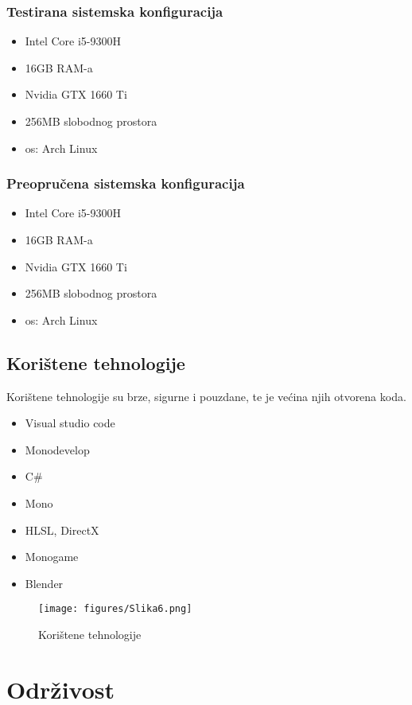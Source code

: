 \documentclass[12pt]{article}
\begin{document}
	\subsubsection{Testirana sistemska konfiguracija}
	\begin{itemize}
		\item	Intel Core i5-9300H
		\item	16GB RAM-a
		\item	Nvidia GTX 1660 Ti
		\item	256MB slobodnog prostora
		\item 	os: Arch Linux
	\end{itemize}

	\subsubsection{Preopručena sistemska konfiguracija}
	\begin{itemize}
		\item	Intel Core i5-9300H
		\item	16GB RAM-a
		\item	Nvidia GTX 1660 Ti
		\item	256MB slobodnog prostora
		\item 	os: Arch Linux
	\end{itemize}	
	
	\clearpage
	\subsection{Korištene tehnologije}
	Korištene tehnologije su brze, sigurne i pouzdane, te je većina njih otvorena koda.
	\begin{itemize}
		\item	Visual studio code
		\item	Monodevelop
		\item	C\#
		\item	Mono
		\item	HLSL, DirectX
		\item	Monogame
		\item	Blender
	\end{itemize}

	\begin{wrapfigure}{R}{1\textwidth}
		\texttt{[image: figures/Slika6.png]}
		\caption{Korištene tehnologije}
		\label{fig:fig_5}
	\end{wrapfigure}
	
	\clearpage
	\section{Održivost}
	
\end{document}

